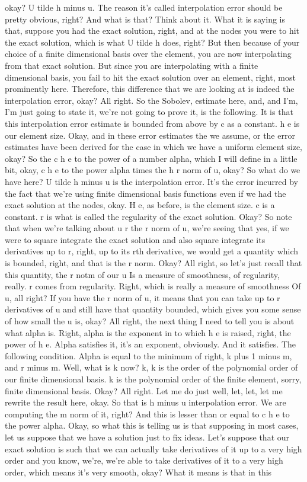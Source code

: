 \documentclass[10pt]{article}
\begin{document}
{okay? U tilde h minus u. The reason it's called interpolation error should be pretty obvious, right? And what is that? Think about it. What it is saying is that, suppose you had the exact solution, right, and at the nodes you were to hit the exact solution, which is what U tilde h does, right? But then because of your choice of a finite dimensional basis over the element, you are now interpolating from that exact solution. But since you are interpolating with a finite dimensional basis, you fail to hit the exact solution over an element, right, most prominently here. Therefore, this difference that we are looking at is indeed the interpolation error, okay? All right. So the Sobolev, estimate here, and, and I'm, I'm just going to state it, we're not going to prove it, is the following. It is that this interpolation error estimate is bounded from above by c as a constant. h e is our element size. Okay, and in these error estimates the we assume, or the error estimates have been derived for the case in which we have a uniform element size, okay? So the c h e to the power of a number alpha, which I will define in a little bit, okay, c h e to the power alpha times the h r norm of u, okay? So what do we have here? U tilde h minus u is the interpolation error. It's the error incurred by the fact that we're using finite dimensional basis functions even if we had the exact solution at the nodes, okay. H e, as before, is the element size. c is a constant. r is what is called the regularity of the exact solution. Okay? So note that when we're talking about u r the r norm of u, we're seeing that yes, if we were to square integrate the exact solution and also square integrate its derivatives up to r, right, up to its rth derivative, we would get a quantity which is bounded, right, and that is the r norm. Okay? All right, so let's just recall that this quantity, the r notm of our u Is a measure of smoothness, of regularity, really. r comes from regularity. Right, which is really a measure of smoothness Of u, all right? If you have the r norm of u, it means that you can take up to r derivatives of u and still have that quantity bounded, which gives you some sense of how small the u is, okay? All right, the next thing I need to tell you is about what alpha is. Right, alpha is the exponent in to which h e is raised, right, the power of h e. Alpha satisfies it, it's an exponent, obviously. And it satisfies. The following condition. Alpha is equal to the minimum of right, k plus 1 minus m, and r minus m. Well, what is k now? k, k is the order of the polynomial order of our finite dimensional basis. k is the polynomial order of the finite element, sorry, finite dimensional basis. Okay? All right. Let me do just well, let, let, let me rewrite the result here, okay. So that is h minus u interpolation error. We are computing the m norm of it, right? And this is lesser than or equal to c h e to the power alpha. Okay, so what this is telling us is that supposing in most cases, let us suppose that we have a solution just to fix ideas. Let's suppose that our exact solution is such that we can actually take derivatives of it up to a very high order and you know, we're, we're able to take derivatives of it to a very high order, which means it's very smooth, okay? What it means is that in this }
\end{document}
